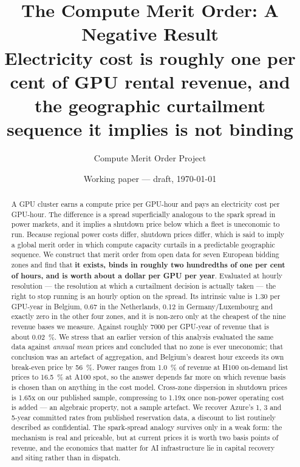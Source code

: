 \documentclass[11pt]{article}
\title{The Compute Merit Order: A Negative Result\\
\large Electricity cost is roughly one per cent of GPU rental revenue,
and the geographic curtailment sequence it implies is not binding}
\author{Compute Merit Order Project}
\date{Working paper --- draft, \today}
\begin{document}
\maketitle

\begin{abstract}
A GPU cluster earns a compute price per GPU-hour and pays an electricity
cost per GPU-hour. The difference is a spread superficially analogous to
the spark spread in power markets, and it implies a shutdown price below
which a fleet is uneconomic to run. Because regional power costs differ,
shutdown prices differ, which is said to imply a global merit order in
which compute capacity curtails in a predictable geographic sequence. We
construct that merit order from open data for seven European bidding zones
and find that \textbf{it exists, binds in roughly two hundredths of one
per cent of hours, and is worth about a dollar per GPU per year}. Evaluated
at hourly resolution --- the resolution at which a curtailment decision is
actually taken --- the right to stop running is an hourly option on the
spread. Its intrinsic value is \SI{1.30}{\usd} per GPU-year in Belgium,
\SI{0.67}{\usd} in the Netherlands, \SI{0.12}{\usd} in Germany/Luxembourg
and exactly zero in the other four zones, and it is non-zero only at the
cheapest of the nine revenue bases we measure. Against roughly
\SI{7000}{\usd} per GPU-year of revenue that is about
\SI{0.02}{\percent}. We stress that an earlier version of this analysis
evaluated the same data against \emph{annual mean} prices and concluded
that no zone is ever uneconomic; that conclusion was an artefact of
aggregation, and Belgium's dearest hour exceeds its own break-even price by
\SI{56}{\percent}. Power ranges from \SI{1.0}{\percent} of revenue at H100
on-demand list prices to \SI{16.5}{\percent} at A100 spot, so the answer
depends far more on which revenue basis is chosen than on anything in the
cost model. Cross-zone dispersion in shutdown prices is \num{1.65}x on our
published sample, compressing to \num{1.19}x once non-power operating cost
is added --- an algebraic property, not a sample artefact. We recover
Azure's \num{1}, \num{3} and \num{5}-year committed rates from published
reservation data, a discount to list routinely described as confidential.
The spark-spread analogy survives only in a weak form: the mechanism is
real and priceable, but at current prices it is worth two basis points of
revenue, and the economics that matter for AI infrastructure lie in capital
recovery and siting rather than in dispatch.
\end{abstract}
\end{document}
